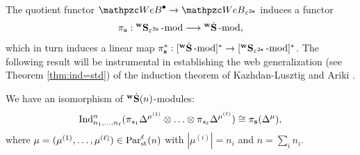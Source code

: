 The quotient functor  $ \qAW \rightarrow \qW_{\eps^{2\bfs}}$ induces a functor 
\[
\pi_{\mathbf{s}}: {}^{\bold{w}}\bold{S}_{\varepsilon^{2\mathbf{s}}}\operatorname{-mod}\nolimits\longrightarrow {}^{\bold{w}}\dot{\bold{S}}\operatorname{-mod}\nolimits, 
\]
which in turn induces a linear map
$\pi_{\mathbf{s}}^*: [{}^{\bold{w}}\dot{\bold{S}}\operatorname{-mod}\nolimits]^* \rightarrow[{}^{\bold{w}}\bold{S}_{\varepsilon^{2\mathbf{s}}}\operatorname{-mod}\nolimits]^*$. The following result will be instrumental in establishing the web generalization (see Theorem \ref{thm:ind=std}) of the induction theorem of Kazhdan-Lusztig \cite{KL87} and Ariki \cite{Ar96}. 

\begin{theorem} 
\label{thm:induced}
We have an isomorphism of ${}^{\bold{w}}\dot{\bold{S}}(n)$-modules:
\[ 
\operatorname{Ind}\nolimits_{n_1,\ldots,n_\ell}^n(\pi_{s_1} \Delta^{\mu^{(1)}}\otimes\ldots \otimes \pi_{s_\ell} \Delta^{\mu^{(\ell)}} )\cong \pi_{\mathbf{s}} (\Delta^{\mu}),
\]
where $\mu=(\mu^{(1)}, \ldots, \mu^{(\ell)})\in \text{Par}^\ell_{\text{st}}(n)$ with $|\mu^{(i)}|=n_i$ and $n= \sum_i n_i$.    
\end{theorem}

